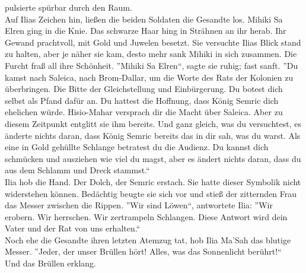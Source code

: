 pulsierte spürbar durch den Raum.\\
Auf Ilias Zeichen hin, ließen die beiden Soldaten die Gesandte los. Mihiki Sa Elren ging in die 
Knie. Das schwarze Haar hing in Strähnen an ihr herab. Ihr Gewand prachtvoll, mit Gold und Juwelen 
besetzt. Sie versuchte Ilias Blick stand zu halten, aber je näher sie kam, desto mehr sank Mihiki 
in sich zusammen. Die Furcht fraß all ihre Schönheit. 
''Mihiki Sa Elren``, sagte sie ruhig; fast sanft. ''Du kamst nach Saleica, nach Brom-Dallar, um die 
Worte des Rats der Kolonien zu überbringen. Die Bitte der Gleichstellung und Einbürgerung. Du 
botest dich selbst als Pfand dafür an. Du hattest die Hoffnung, dass König Semric dich 
ehelichen würde. Hisio-Mahar versprach dir die Macht über Saleica. Aber zu diesem Zeitpunkt 
entglitt sie ihm bereits. Und ganz gleich, was du versuchtest, es änderte nichts daran, dass 
König Semric bereits das in dir sah, was du warst. Als eine in Gold gehüllte Schlange betratest 
du die Audienz. Du kannst dich schmücken und ausziehen wie viel du magst, aber es ändert nichts 
daran, dass du aus dem Schlamm und Dreck stammst.``\\
Ilia hob die Hand. Der Dolch, der Semric erstach. Sie hatte dieser Symbolik nicht widerstehen 
können. Bedächtig beugte sie sich vor und stieß der zitternden Frau das Messer zwischen die Rippen. 
''Wir sind Löwen``, antwortete Ilia: ''Wir erobern. Wir herrschen. Wir zertrampeln Schlangen. Diese 
Antwort wird dein Vater und der Rat von uns erhalten.``\\
Noch ehe die Gesandte ihren letzten Atemzug tat, hob Ilia Ma'Sah das blutige Messer. ''Jeder, der 
unser Brüllen hört! Alles, was das Sonnenlicht berührt!``\\
Und das Brüllen erklang.\\




